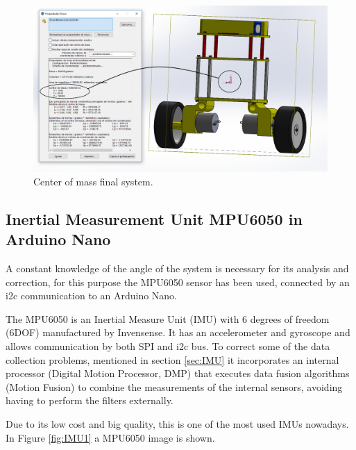 \begin{figure}[H]
	\center
	\includegraphics[scale=0.3]{imagenes/Balancing_robot/center_mass}
	\caption{Center of mass final system.}
	\label{fig:center_mass}
\end{figure}

\subsection{Inertial Measurement Unit MPU6050 in Arduino Nano}\label{sec:MPU6050}

A constant knowledge of the angle of the system is necessary for its analysis and correction, for this purpose the MPU6050 sensor has been used, connected by an i2c communication to an Arduino Nano. \newline

The MPU6050 is an Inertial Measure Unit (IMU) with 6 degrees of freedom (6DOF) manufactured by Invensense. It has an accelerometer and gyroscope and allows communication by both SPI and i2c bus. To correct some of the data collection problems, mentioned in section \ref{sec:IMU} it incorporates an internal processor (Digital Motion Processor, DMP) that executes data fusion algorithms (Motion Fusion) to combine the measurements of the internal sensors, avoiding having to perform the filters externally.\newline

Due to its low cost and big quality, this is one of the most used IMUs nowadays. In Figure \ref{fig:IMU1} a MPU6050 image is shown.

